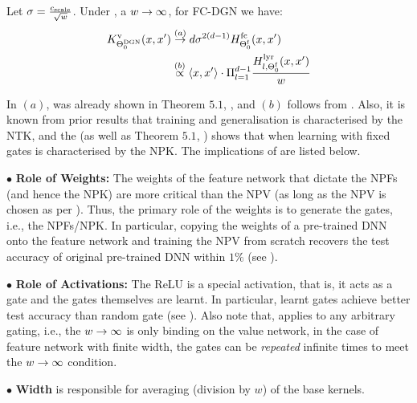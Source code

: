 \begin{theorem}\label{th:main} Let $\sigma=\frac{c_{\text{scale}}}{\sqrt{w}}$. Under , a $w\rightarrow\infty$, for FC-DGN we have: 
\begin{align*}
K^{\text{v}}_{\Theta^{\text{DGN}}_0}(x,x')&\stackrel{(a)}{\rightarrow} d \sigma^{2(d-1)} H^{\text{fc}}_{\Theta^{\textrm{f}}_0}(x,x')\\ 
&\stackrel{(b)}\propto \langle x,x'\rangle\cdot \Pi_{l=1}^{d-1} \frac{H^{\text{lyr}}_{l,\Theta^{\textrm{f}}_0}(x,x')}{w}
\end{align*}
\end{theorem}
In  $(a)$, was already shown in {Theorem $5.1$}, \cite{npk}, and $(b)$ follows from . Also, it is known from prior results \cite{arora2019exact,cao2019generalization} that training and generalisation is characterised by the NTK, and the  (as well as {Theorem $5.1$}, \cite{npk}) shows that when learning with fixed gates is characterised by the NPK. The implications of  are listed below.

$\bullet$ \textbf{Role of Weights:}  The weights of the feature network that dictate the NPFs (and hence the NPK) are more critical than the NPV (as long as the NPV is chosen as per ). Thus, the primary role of the weights is to generate the gates, i.e., the NPFs/NPK. In particular, copying the weights of a pre-trained DNN onto the feature network and training the NPV from scratch recovers the test accuracy of original pre-trained DNN within $1\%$ (see ). 

$\bullet$ \textbf{Role of Activations:} The ReLU is a special activation, that is, it acts as a gate and the gates themselves are learnt. In particular, learnt gates achieve better test accuracy than random gate (see ). Also note that,  applies to any arbitrary gating, i.e., the $w\rightarrow\infty$ is only binding on the value network, in the case of feature network with finite width, the gates can be \emph{repeated} infinite times to meet the $w\rightarrow\infty$ condition. 

$\bullet$ \textbf{Width} is responsible for averaging (division by $w$) of the base kernels.

